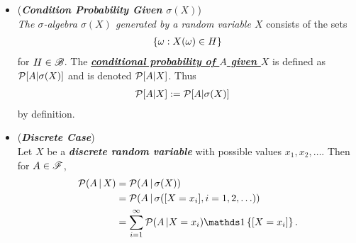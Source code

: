 \documentclass[11pt]{article}
\begin{document}
\begin{itemize}
\item \begin{remark} (\emph{\textbf{Condition Probability Given $\sigma(X)$}})\\
\emph{The $\sigma$-algebra $\sigma(X)$ generated by a random variable $X$} consists of the sets
\begin{align*}
\left\{\omega: X(\omega) \in H\right\}
\end{align*} for $H \in {\mathscr B}$. The \underline{\emph{\textbf{conditional probability of $A$ given $X$}}} is defined as ${\mathcal P}[A | \sigma(X)]$ and is denoted ${\mathcal P}[A | X]$. Thus
\begin{align*}
{\mathcal P}[A | X] &:= {\mathcal P}[A | \sigma(X)]
\end{align*}
 by definition. 
\end{remark}

\item \begin{example} (\emph{\textbf{Discrete Case}})\\
Let $X$ be a \emph{\textbf{discrete random variable}} with possible values $x_1, x_2, \ldots$. Then for $A \in {\mathscr F}$, 
\begin{align*}
\cP(A \,|\,X) &= \cP(A \,|\, \sigma(X))\\
&= \cP(A \,|\, \sigma([X =x_i], i = 1, 2, \ldots))\\
&= \sum_{i=1}^{\infty}\cP(A \,| X=x_i) \ind{[X=x_i]}.
\end{align*}
\end{example}


\end{itemize}
\end{document}
